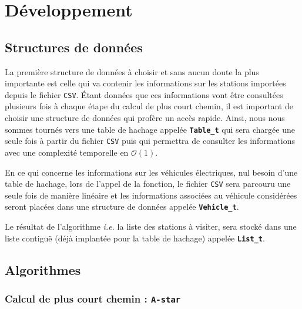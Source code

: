 \documentclass[a4paper, 12pt]{report}
\begin{document}
\section{Développement}
\subsection{Structures de données}
La première structure de données à choisir et sans aucun doute la plus importante est celle qui va contenir les informations sur les stations importées depuis le fichier \texttt{CSV}. Étant données que ces informations vont être consultées plusieurs fois à chaque étape du calcul de plus court chemin, il est important de choisir une structure de données qui profère un accès rapide. Ainsi, nous nous sommes tournés vers une table de hachage appelée \textbf{\texttt{Table\_t}} qui sera chargée une seule fois à partir du fichier \texttt{CSV} puis qui permettra de consulter les informations avec une complexité temporelle en $\mathcal{O}(1)$.\par\bigskip
En ce qui concerne les informations sur les véhicules électriques, nul besoin d'une table de hachage, lors de l'appel de la fonction, le fichier \texttt{CSV} sera parcouru une seule fois de manière linéaire et les informations associées au véhicule considérées seront placées dans une structure de données appelée \textbf{\texttt{Vehicle\_t}}.\par\bigskip
Le résultat de l'algorithme \textit{i.e.} la liste des stations à visiter, sera stocké dans une liste contiguë (déjà implantée pour la table de hachage) appelée \textbf{\texttt{List\_t}}.\par\bigskip
\subsection{Algorithmes}
\subsubsection{Calcul de plus court chemin : \texttt{A-star}}
\end{document}
